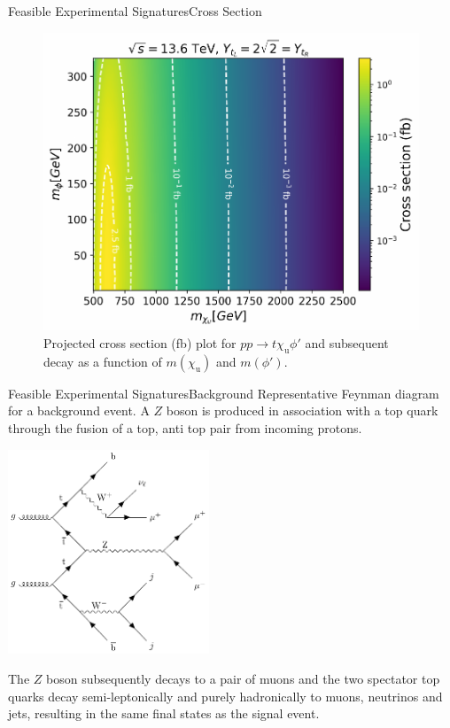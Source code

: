 \documentclass{../bredelebeamer}
\begin{document}
\begin{frame}{Feasible Experimental Signatures}{Cross Section}
	\begin{figure}
    \centering
    \includegraphics[width=.7\linewidth]{cross_section_by_masses.pdf}
    \caption{Projected cross section (fb) plot for $pp\to t \chi_\mathrm{u} \phi'$ and subsequent decay as a function of $m(\chi_\mathrm{u})$ and $m(\phi')$.}
    \label{fig:xs-plot}
\end{figure}

\end{frame}

\begin{frame}{Feasible Experimental Signatures}{Background}
	Representative Feynman diagram for a background event. A $Z$ boson is produced in association with a top quark through the fusion of a top, anti top pair from incoming protons. 
	\begin{center}
		\includegraphics[width=0.45\textwidth]{bg_Z_full.pdf}
	\end{center}
	The $Z$ boson subsequently decays to a pair of muons and the two spectator top quarks decay semi-leptonically and purely hadronically to muons, neutrinos and jets, resulting in the same final states as the signal event.
\end{frame}
\end{document}
